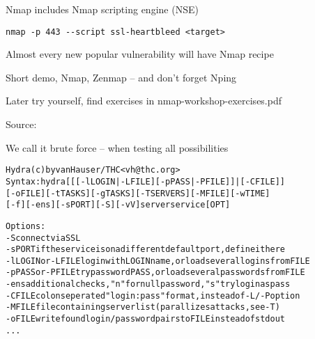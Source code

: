 \documentclass[Screen16to9,17pt]{foils}
\begin{document}
Nmap includes Nmap scripting engine (NSE)


\begin{list1}
\item \verb+nmap -p 443 --script ssl-heartbleed <target>+\\
\item Almost every new popular vulnerability will have Nmap recipe
\end{list1}



\begin{list2}
\item Short demo, Nmap, Zenmap -- and don't forget Nping
\item Later try yourself, find exercises in nmap-workshop-exercises.pdf
\end{list2}






Source:




\begin{list1}
\item We call it brute force -- when testing all possibilities
\end{list1}

\begin{alltt}\small
Hydra (c) by van Hauser / THC <vh@thc.org>
Syntax: hydra [[[-l LOGIN|-L FILE] [-p PASS|-P FILE]] | [-C FILE]]
[-o FILE] [-t TASKS] [-g TASKS] [-T SERVERS] [-M FILE] [-w TIME]
[-f] [-e ns] [-s PORT] [-S] [-vV] server service [OPT]

Options:
  -S        connect via SSL
  -s PORT   if the service is on a different default port, define it here
  -l LOGIN  or -L FILE login with LOGIN name, or load several logins from FILE
  -p PASS   or -P FILE try password PASS, or load several passwords from FILE
  -e ns     additional checks, "n" for null password, "s" try login as pass
  -C FILE   colon seperated "login:pass" format, instead of -L/-P option
  -M FILE   file containing server list (parallizes attacks, see -T)
  -o FILE   write found login/password pairs to FILE instead of stdout
...
\end{alltt}
\end{document}
